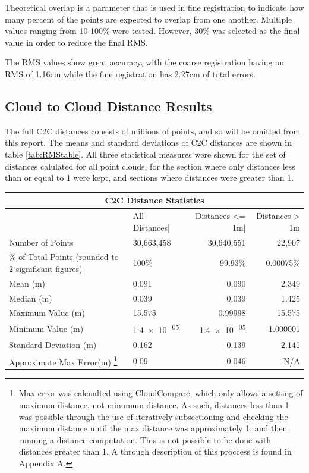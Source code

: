 \documentclass[man]{apa7}
\begin{document}
Theoretical overlap is a parameter that is used in fine registration to indicate how many percent of the points are expected to overlap from one another. Multiple values ranging from 10-100\% were tested. However, 30\% was selected as the final value in order to reduce the final RMS.

The RMS values show great accuracy, with the coarse registration having an RMS of 1.16cm while the fine registration has 2.27cm of total errors.


\subsection{Cloud to Cloud Distance Results}

The full C2C distances consists of millions of points, and so will be omitted from this report. The means and standard deviations of C2C distances are shown in table \ref{tab:RMStable}. All three statistical measures were shown for the set of distances calulated for all point clouds, for the section where only distances less than or equal to 1 were kept, and sections where distances were greater than 1.

\begin{minipage}{\linewidth}
  \small
  \setlength{\tabcolsep}{3pt} %
  \renewcommand{\arraystretch}{0.8} %
  \label{tab:RMStable}
  \begin{tabular}{@{}llrr@{}}         \toprule
  \multicolumn{4}{c}{C2C Distance Statistics }        \\ \toprule{}
  &  All Distances|    & Distances <= 1m| & Distances > 1m \\ \midrule
  Number of Points & 30,663,458  & 30,640,551  & 22,907  \\
  \% of Total Points (rounded to 2 significant figures) & 100\% & 99.93\% & 0.00075\% \\
  Mean (m)      & 0.091 & 0.090 & 2.349  \\
  Median (m)    & 0.039 &  0.039  & 1.425   \\
  Maximum Value (m)       & 15.575  & 0.99998  & 15.575   \\
  Minimum Value (m)       & \num{1.4e-05}  & \num{1.4e-05} & 1.000001  \\
  Standard Deviation (m)  & 0.162  & 0.139 & 2.141 \\ 
  Approximate Max Error(m) \footnote{Max error was calcualted using CloudCompare, which only allows a setting of maximum distance, not minumum distance. As such, distances less than 1 was possible through the use of iteratively subsectioning and checking the maximum distance until the max distance was approximately 1, and then running a distance computation. This is not possible to be done with distances greater than 1. A through description of this proccess is found in Appendix A.} & 0.09 &  0.046 & N/A \\ \bottomrule
  \end{tabular}
\end{minipage}
\end{document}
